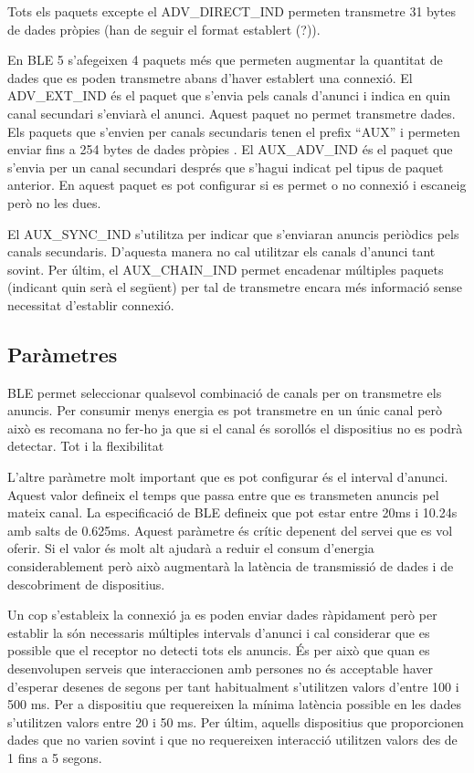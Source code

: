 Tots els paquets excepte el ADV\_DIRECT\_IND permeten transmetre 31 bytes de dades pròpies (han de seguir el format establert (?)).

\label{Advertising_Extension_PDU}
En BLE 5 s'afegeixen 4 paquets més que permeten augmentar la quantitat de dades que es poden transmetre abans d'haver establert una connexió.
El ADV\_EXT\_IND és el paquet que s'envia pels canals d'anunci i indica en quin canal secundari s'enviarà el anunci. Aquest paquet no permet transmetre dades.
Els paquets que s'envien per canals secundaris tenen el prefix ``AUX'' i permeten enviar fins a 254 bytes de dades pròpies .
El AUX\_ADV\_IND és el paquet que s'envia per un canal secundari després que s'hagui indicat pel tipus de paquet anterior.
En aquest paquet es pot configurar si es permet o no connexió i escaneig però no les dues.

El AUX\_SYNC\_IND s'utilitza per indicar que s'enviaran anuncis periòdics pels canals secundaris.
D'aquesta manera no cal utilitzar els canals d'anunci tant sovint.
Per últim, el AUX\_CHAIN\_IND permet encadenar múltiples paquets (indicant quin serà el següent) per tal de transmetre encara més informació sense necessitat d'establir connexió.

\subsection{Paràmetres}
BLE permet seleccionar qualsevol combinació de canals per on transmetre els anuncis.
Per consumir menys energia es pot transmetre en un únic canal però això es recomana no fer-ho ja que si el canal és sorollós el dispositius no es podrà detectar.
Tot i la flexibilitat

L'altre paràmetre molt important que es pot configurar és el interval d'anunci.
Aquest valor defineix el temps que passa entre que es transmeten anuncis pel mateix canal.
La especificació de BLE defineix que pot estar entre 20ms i 10.24s amb salts de 0.625ms.
Aquest paràmetre és crític depenent del servei que es vol oferir.
Si el valor és molt alt ajudarà a reduir el consum d'energia considerablement però això augmentarà la latència de transmissió de dades i de descobriment de dispositius.

Un cop s'estableix la connexió ja es poden enviar dades ràpidament però per establir la són necessaris múltiples intervals d'anunci i cal considerar que es possible que el receptor no detecti tots els anuncis. 
És per això que quan es desenvolupen serveis que interaccionen amb persones no és acceptable haver d'esperar desenes de segons per tant habitualment s'utilitzen valors d'entre 100 i 500 ms.
Per a dispositiu que requereixen la mínima latència possible en les dades s'utilitzen valors entre 20 i 50 ms.
Per últim, aquells dispositius que proporcionen dades que no varien sovint i que no requereixen interacció utilitzen valors des de 1 fins a 5 segons.


